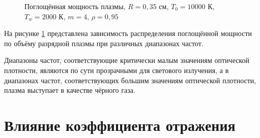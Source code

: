 \begin{figure}[ht]
	\noindent{}
	\captionsetup{justification=centering}
	\caption{Поглощённая мощность плазмы, $R = 0,35$ см, $T_0 = 10000$ К, $T_w = 2000$ К, $m = 4$, $\rho = 0,95$}
	\label{plt:d_nu}
\end{figure}

На рисунке \ref{plt:d_nu} представлена зависимость распределения поглощённой мощности по объёму разрядной плазмы при различных диапазонах частот.

Диапазоны частот, соответствующие критически малым значениям оптической плотности, являются по сути прозрачными для светового излучения, а в диапазонах частот, соответствующих большим значениям оптической плотности, плазма выступает в качестве чёрного газа.


\section{Влияние коэффициента отражения}

